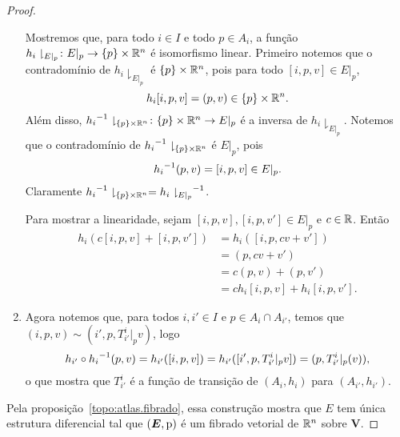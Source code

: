 \begin{proof}
\begin{enumerate}
Mostremos que, para todo $i \in I$ e todo $p \in A_i$, a função $h_i\downharpoonright_{E|_p} \colon E|_p \to \{p\} \times \mathbb{R}^n$ é isomorfismo linear. Primeiro notemos que o contradomínio de $h_i\downharpoonright_{E|_p}$ é $\{p\} \times \mathbb{R}^n$, pois para todo $[i,p,v] \in E|_p$,
	\begin{equation*}
	h_i [i,p,v] = (p,v) \in \{p\} \times \mathbb{R}^n.
	\end{equation*}
Além disso, ${h_i}^{-1}\downharpoonright_{\{p\} \times \mathbb{R}^n} \colon \{p\} \times \mathbb{R}^n \to E|_p$ é a inversa de $h_i\downharpoonright_{E|_p}$. Notemos que o contradomínio de ${h_i}^{-1}\downharpoonright_{\{p\} \times \mathbb{R}^n}$ é $E|_p$, pois
	\begin{equation*}
	{h_i}^{-1} (p,v) = [i,p,v] \in E|_p.
	\end{equation*}
Claramente ${h_i}^{-1}\downharpoonright_{\{p\} \times \mathbb{R}^n} = {h_i\downharpoonright_{E|_p}}^{-1}$.

Para mostrar a linearidade, sejam $[i,p,v], [i,p,v'] \in E|_p$ e $c \in \mathbb{R}$. Então
	\begin{align*}
	h_i (c[i,p,v] + [i,p,v']) &= h_i ([i,p,cv+v']) \\
		&= (p,cv+v') \\
		&= c(p,v) + (p,v') \\
		&= c h_i [i,p,v] + h_i[i,p,v'].
	\end{align*}

\item Agora notemos que, para todos $i,i' \in I$ e $p \in A_i \cap A_{i'}$, temos que $(i,p,v) \sim (i',p,T^i_{i'}|_p v)$, logo
	\begin{equation*}
	h_{i'} \circ {h_i}^{-1} (p,v) = h_{i'} ([i,p,v]) = h_{i'} ([i',p,T^i_{i'}|_p v]) = (p,T^i_{i'}|_p (v)),
	\end{equation*}
o que mostra que $T^i_{i'}$ é a função de transição de $(A_i,h_i)$ para $(A_{i'},h_{i'})$.
\end{enumerate}

Pela proposição~\ref{topo:atlas.fibrado}, essa construção mostra que $E$ tem única estrutura diferencial tal que $(\bm E, \mathrm{p})$ é um fibrado vetorial de $\mathbb{R}^n$ sobre $\bm V$.
\end{proof}

